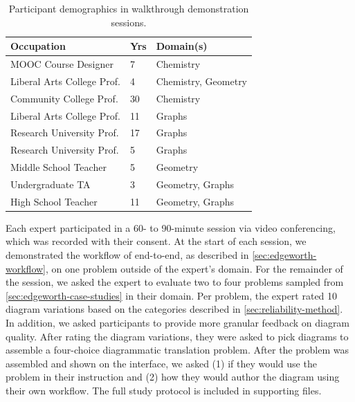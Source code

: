 \begin{table}
    \centering
    \begin{tabular}{l|l|l}
        \textbf{Occupation} & \textbf{Yrs} & \textbf{Domain(s)}    \\
        \hline
        MOOC Course Designer       &  7 & Chemistry           \\ 
        Liberal Arts College Prof. &  4 & Chemistry, Geometry \\
        Community College Prof.    & 30 & Chemistry           \\
        Liberal Arts College Prof. & 11 & Graphs              \\
        Research University Prof.  & 17 & Graphs              \\
        Research University Prof.  &  5 & Graphs              \\
        Middle School Teacher      &  5 & Geometry            \\
        Undergraduate TA           &  3 & Geometry, Graphs    \\
        High School Teacher        & 11 & Geometry, Graphs    \\
    \end{tabular}
    \caption{Participant demographics in walkthrough demonstration sessions.}
    \label{tab:demographics}
\end{table}

Each expert participated in a 60- to 90-minute session via video conferencing, which was recorded with their consent. At the start of each session, we demonstrated the workflow of \Edgeworth end-to-end, as described in \cref{sec:edgeworth-workflow}, on one problem outside of the expert's domain. For the remainder of the session, we asked the expert to evaluate two to four problems sampled from \cref{sec:edgeworth-case-studies} in their domain. Per problem, the expert rated 10 diagram variations based on the categories described in \cref{sec:reliability-method}. In addition, we asked participants to provide more granular feedback on diagram quality. After rating the diagram variations, they were asked to pick diagrams to assemble a four-choice diagrammatic translation problem. After the problem was assembled and shown on the interface, we asked (1) if they would use the problem in their instruction and (2) how they would author the diagram using their own workflow. The full study protocol is included in supporting files.

